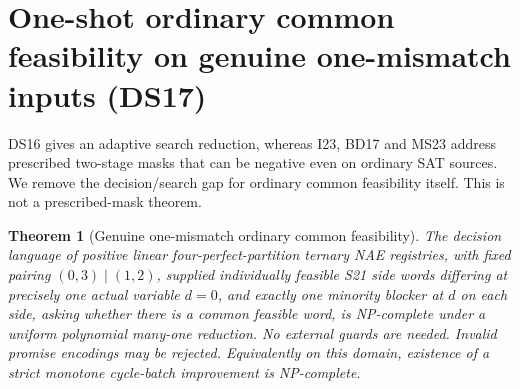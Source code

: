 \documentclass[11pt]{article}
\newtheorem{theorem}{Theorem}
\begin{document}
\section{One-shot ordinary common feasibility on genuine one-mismatch inputs (DS17)}\label{sec:ds17}
DS16 gives an adaptive search reduction, whereas I23, BD17 and MS23 address prescribed two-stage masks that can be negative even on ordinary SAT sources. We remove the decision/search gap for ordinary common feasibility itself. This is not a prescribed-mask theorem.

\begin{theorem}[Genuine one-mismatch ordinary common feasibility]\label{thm:ds17-one-shot}
The decision language of positive linear four-perfect-partition ternary NAE registries, with fixed pairing $(0,3)\mid(1,2)$, supplied individually feasible S21 side words differing at precisely one actual variable $d=0$, and exactly one minority blocker at $d$ on each side, asking whether there is a common feasible word, is NP-complete under a uniform polynomial many-one reduction. No external guards are needed. Invalid promise encodings may be rejected. Equivalently on this domain, existence of a strict monotone cycle-batch improvement is NP-complete.
\end{theorem}
\end{document}
